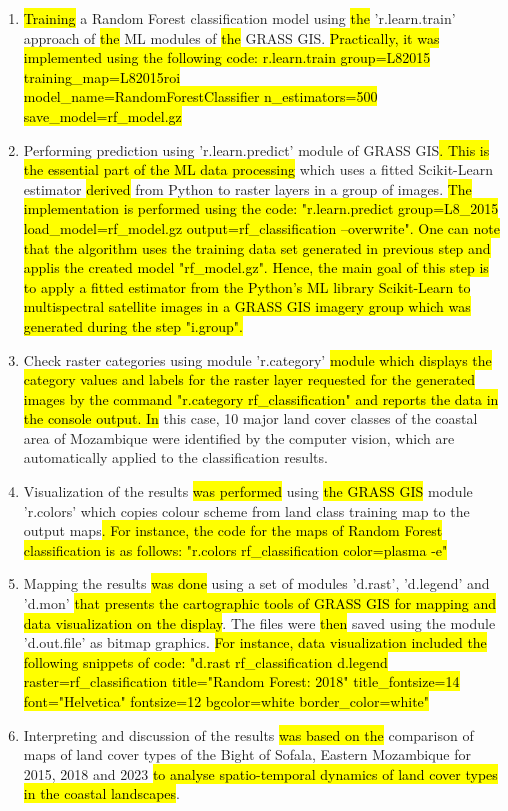 \documentclass[coasts,article,submit,pdftex,moreauthors]{Definitions/mdpi}
\begin{document}
\begin{enumerate}
  \item \hl{Training} a Random Forest classification model using \hl{the }'r.learn.train' approach of \hl{the }ML modules of \hl{the }GRASS GIS. \hl{Practically, it was implemented using the following code: r.learn.train group=L82015 training\_map=L82015roi \\
  model\_name=RandomForestClassifier n\_estimators=500 save\_model=rf\_model.gz}
  \item Performing prediction using 'r.learn.predict' module of GRASS GIS\hl{. This is the essential part of the ML data processing }which uses a fitted Scikit-Learn estimator \hl{derived} from Python to raster layers in a group of images. \hl{The implementation is performed using the code: "r.learn.predict group=L8\_2015 load\_model=rf\_model.gz output=rf\_classification --overwrite". One can note that the algorithm uses the training data set generated in previous step and applis the created model "rf\_model.gz". Hence, the main goal of this step is to apply a fitted estimator from the Python's ML library Scikit-Learn to multispectral satellite images in a GRASS GIS imagery group which was generated during the step "i.group".} 
  \item Check raster categories using module 'r.category' \hl{module which displays the category values and labels for the raster layer requested for the generated images by the command "r.category rf\_classification" and reports the data in the console output. In } this case, 10 major land cover classes of the coastal area of Mozambique were identified by the computer vision, which are automatically applied to the classification results.
  \item Visualization of the results \hl{was performed }using \hl{the GRASS GIS }module 'r.colors' which copies colour scheme from land class training map to the output maps\hl{. For instance, the code for the maps of Random Forest classification is as follows: "r.colors rf\_classification color=plasma -e"}
  \item Mapping the results \hl{was done }using a set of modules 'd.rast', 'd.legend' and 'd.mon' \hl{that presents the cartographic tools of GRASS GIS for mapping and data visualization on the display}. The files were \hl{then }saved using the module 'd.out.file' as bitmap graphics. \hl{For instance, data visualization included the following snippets of code: "d.rast rf\_classification d.legend raster=rf\_classification title="Random Forest: 2018" title\_fontsize=14 font="Helvetica" fontsize=12 bgcolor=white border\_color=white"}
  \item Interpreting and discussion of the results \hl{was based on the} comparison of maps of land cover types of the Bight of Sofala, Eastern Mozambique for 2015, 2018 and 2023 \hl{to analyse spatio-temporal dynamics of land cover types in the coastal landscapes}. 
\end{enumerate}  
\end{document}
